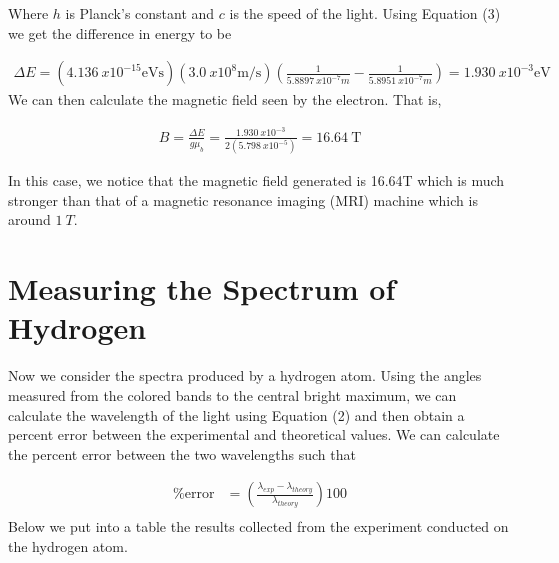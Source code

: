 \documentclass[12pt]{article}
\begin{document}
Where $h$ is Planck's constant and $c$ is the speed of the light. Using Equation (3) we get the difference in energy to be

\begin{equation}
    \begin{split}
        \Delta E = (\SI{4.136}{x10^{-15} \electronvolt\second})(\SI{3.0}{x10^8 \meter\per\second})\left( \frac{1}{\SI{5.8897}{x10^{-7}m}} - \frac{1}{\SI{5.8951}{x10^{-7}m}}\right) = \SI{1.930}{x10^{-3}\electronvolt}
    \end{split}
\end{equation}
We can then calculate the magnetic field seen by the electron. That is,

\begin{equation}
    \begin{split}
        B = \frac{\Delta E}{g\mu_b} = \frac{\SI{1.930}{x10^{-3}}}{2(\SI{5.798}{x10^{-5}})} = \SI{16.64}{\tesla}
    \end{split}
\end{equation}

In this case, we notice that the magnetic field generated is 16.64T which is much stronger than that of a magnetic resonance imaging (MRI) machine which is around $\SI{1}{T}$.

\section{Measuring the Spectrum of Hydrogen}
Now we consider the spectra produced by a hydrogen atom. Using the angles measured from the colored bands to the central bright maximum, we can calculate the wavelength of the light using Equation (2) and then obtain a percent error between the experimental and theoretical values. We can calculate the percent error between the two wavelengths such that

\begin{equation}
    \begin{split}
        \text{\% error} &= \left( \frac{\lambda_{exp} - \lambda_{theory}}{\lambda_{theory}} \right) 100 \\
    \end{split}
\end{equation}
Below we put into a table the results collected from the experiment conducted on the hydrogen atom.

\setlength{\tabcolsep}{1pt}
\renewcommand{\arraystretch}{1.25}
\end{document}

